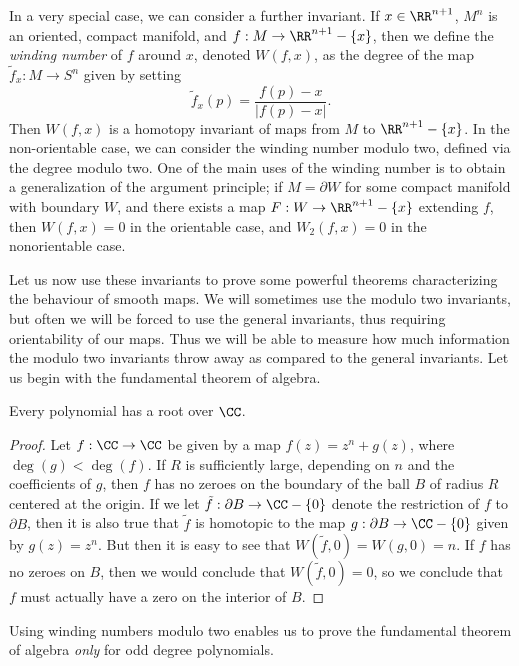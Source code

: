 In a very special case, we can consider a further invariant. If $x \in \RR^{n+1}$, $M^n$ is an oriented, compact manifold, and $f: M \to \RR^{n+1} - \{ x \}$, then we define the \emph{winding number} of $f$ around $x$, denoted $W(f,x)$, as the degree of the map $\tilde{f}_x: M \to S^n$ given by setting
%
\[ \tilde{f}_x(p) = \frac{f(p) - x}{|f(p) - x|}. \]
%
Then $W(f,x)$ is a homotopy invariant of maps from $M$ to $\RR^{n+1} - \{ x \}$. In the non-orientable case, we can consider the winding number modulo two, defined via the degree modulo two. One of the main uses of the winding number is to obtain a generalization of the argument principle; if $M = \partial W$ for some compact manifold with boundary $W$, and there exists a map $F: W \to \RR^{n+1} - \{ x \}$ extending $f$, then $W(f,x) = 0$ in the orientable case, and $W_2(f,x) = 0$ in the nonorientable case.

Let us now use these invariants to prove some powerful theorems characterizing the behaviour of smooth maps. We will sometimes use the modulo two invariants, but often we will be forced to use the general invariants, thus requiring orientability of our maps. Thus we will be able to measure how much information the modulo two invariants throw away as compared to the general invariants. Let us begin with the fundamental theorem of algebra.

\begin{theorem}
    Every polynomial has a root over $\CC$.
\end{theorem}
\begin{proof}
    Let $f: \CC \to \CC$ be given by a map $f(z) = z^n + g(z)$, where $\deg(g) < \deg(f)$. If $R$ is sufficiently large, depending on $n$ and the coefficients of $g$, then $f$ has no zeroes on the boundary of the ball $B$ of radius $R$ centered at the origin. If we let $\tilde{f}: \partial B \to \CC - \{ 0 \}$ denote the restriction of $f$ to $\partial B$, then it is also true that $\tilde{f}$ is homotopic to the map $g: \partial B \to \CC - \{ 0 \}$ given by $g(z) = z^n$. But then it is easy to see that $W(\tilde{f},0) = W(g,0) = n$. If $f$ has no zeroes on $B$, then we would conclude that $W(\tilde{f},0) = 0$, so we conclude that $f$ must actually have a zero on the interior of $B$.
\end{proof}

\begin{remark}
    Using winding numbers modulo two enables us to prove the fundamental theorem of algebra \emph{only} for odd degree polynomials.
\end{remark}

